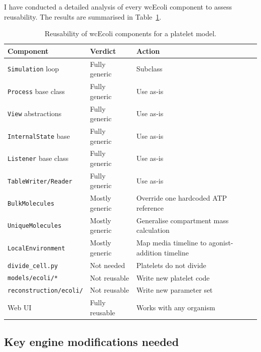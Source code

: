 \documentclass[11pt,a4paper]{article}
\begin{document}
I have conducted a detailed analysis of every wcEcoli component to assess
reusability.  The results are summarised in Table~\ref{tab:reuse}.

\begin{table}[H]
\centering
\caption{Reusability of wcEcoli components for a platelet model.}
\label{tab:reuse}
\small
\begin{tabular}{llp{6cm}}
  \toprule
  \textbf{Component} & \textbf{Verdict} & \textbf{Action} \\
  \midrule
  \texttt{Simulation} loop       & Fully generic & Subclass \\
  \texttt{Process} base class    & Fully generic & Use as-is \\
  \texttt{View} abstractions     & Fully generic & Use as-is \\
  \texttt{InternalState} base    & Fully generic & Use as-is \\
  \texttt{Listener} base class   & Fully generic & Use as-is \\
  \texttt{TableWriter/Reader}    & Fully generic & Use as-is \\
  \texttt{BulkMolecules}         & Mostly generic & Override one
    hardcoded ATP reference \\
  \texttt{UniqueMolecules}       & Mostly generic & Generalise
    compartment mass calculation \\
  \texttt{LocalEnvironment}      & Mostly generic & Map media timeline
    to agonist-addition timeline \\
  \texttt{divide\_cell.py}       & Not needed & Platelets do not divide \\
  \texttt{models/ecoli/*}        & Not reusable & Write new platelet code \\
  \texttt{reconstruction/ecoli/} & Not reusable & Write new parameter set \\
  Web UI                         & Fully reusable & Works with any organism \\
  \bottomrule
\end{tabular}
\end{table}

\subsection{Key engine modifications needed}
\end{document}

